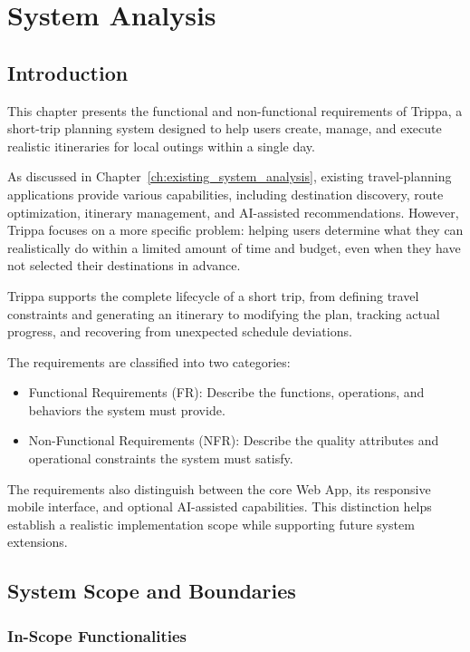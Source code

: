 \chapter{System Analysis}
\label{ch:system_analysis}
\section{Introduction}

This chapter presents the functional and non-functional requirements of Trippa, a short-trip planning system designed to help users create, manage, and execute realistic itineraries for local outings within a single day.


As discussed in Chapter~\ref{ch:existing_system_analysis}, existing travel-planning applications provide various capabilities, including destination discovery, route optimization, itinerary management, and AI-assisted recommendations. However, Trippa focuses on a more specific problem: helping users determine what they can realistically do within a limited amount of time and budget, even when they have not selected their destinations in advance.


Trippa supports the complete lifecycle of a short trip, from defining travel constraints and generating an itinerary to modifying the plan, tracking actual progress, and recovering from unexpected schedule deviations.


The requirements are classified into two categories:


\begin{itemize}
\item Functional Requirements (FR): Describe the functions, operations, and behaviors the system must provide.
\item Non-Functional Requirements (NFR): Describe the quality attributes and operational constraints the system must satisfy.
\end{itemize}


The requirements also distinguish between the core Web App, its responsive mobile interface, and optional AI-assisted capabilities. This distinction helps establish a realistic implementation scope while supporting future system extensions.


\section{System Scope and Boundaries}

\subsection{In-Scope Functionalities}

